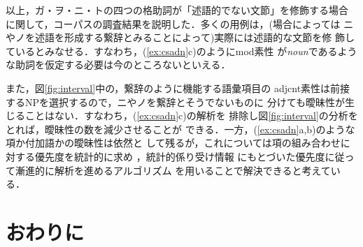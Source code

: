 以上，ガ・ヲ・ニ・トの四つの格助詞が「述語的でない文節」を修飾する場合
に関して，コーパスの調査結果を説明した．多くの用例は，(場合によっては
ニやノを述語を形成する繋辞とみることによって)実際には述語的な文節を修
飾しているとみなせる．すなわち，(\ref{ex:csadn}c)のように{\sc mod}素性
が{\it noun\/}であるような助詞を仮定する必要は今のところないといえる．

また，図\ref{fig:interval}中の，繋辞のように機能する語彙項目の{\sc
adjcnt}素性は前接するNPを選択するので，ニやノを繋辞とそうでないものに
分けても曖昧性が生じることはない．すなわち，(\ref{ex:csadn}c)の解析を
排除し図\ref{fig:interval}の分析をとれば，曖昧性の数を減少させることが
できる．一方，(\ref{ex:csadn}a,b)のような項か付加語かの曖昧性は依然と
して残るが，これについては項の組み合わせに対する優先度を統計的に求め
\cite{Miyata&etal1997,Utsuro&etal1997}，統計的係り受け情報
にもとづいた優先度に従って漸進的に解析を進めるアルゴリズム
\cite{Miyata&etal2000}を用いることで解決できると考えている．

\setcounter{section}{4}

\section{おわりに}\label{sec:cncl}

